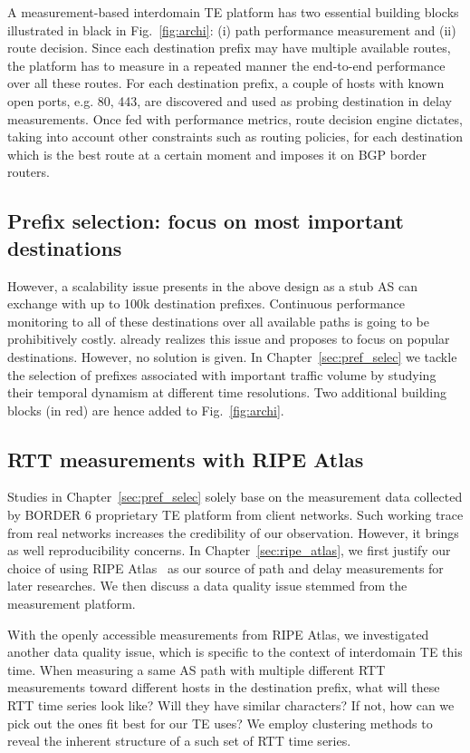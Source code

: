 A measurement-based interdomain TE platform has two essential building blocks illustrated in black in Fig.~\ref{fig:archi}: (i) path performance measurement and (ii) route decision.
Since each destination prefix may have multiple available routes, the platform has to measure in a repeated manner the end-to-end performance over all these routes. 
For each destination prefix, a couple of hosts with known open ports, e.g. 80, 443, are discovered and used as probing destination in delay measurements.
Once fed with performance metrics, route decision engine dictates,  taking into account other constraints such as routing policies, for each destination which is the best route at a certain moment and imposes it on BGP border routers.

\subsection{Prefix selection: focus on most important destinations}
However, a scalability issue presents in the above design as a stub AS can exchange with up to 100k destination prefixes.
Continuous performance monitoring to all of these destinations over all available paths is going to be prohibitively costly.
\cite{Feamster2003} already realizes this issue and proposes to focus on popular destinations.
However, no solution is given.
In Chapter~\ref{sec:pref_selec} we tackle the selection of prefixes associated with important traffic volume by studying their temporal dynamism at different time resolutions. Two additional building blocks (in red) are hence added to Fig.~\ref{fig:archi}.

\subsection{RTT measurements with RIPE Atlas}
Studies in Chapter~\ref{sec:pref_selec} solely base on the measurement data collected by BORDER 6 proprietary TE platform from client networks. Such working trace from real networks increases the credibility of our observation. However, it brings as well reproducibility concerns.
In Chapter~\ref{sec:ripe_atlas}, we first justify our choice of using RIPE Atlas~\cite{atlas} as our source of path and delay measurements for later researches.
We then discuss a data quality issue stemmed from the measurement platform.

With the openly accessible measurements from RIPE Atlas, we investigated another data quality issue, which is specific to the context of interdomain TE this time. When measuring a same AS path with multiple different \acf{RTT} measurements toward different hosts in the destination prefix, what will these RTT time series look like? Will they have similar characters? If not, how can we pick out the ones fit best for our TE uses? We employ clustering methods to reveal the inherent structure of a such set of RTT time series.

